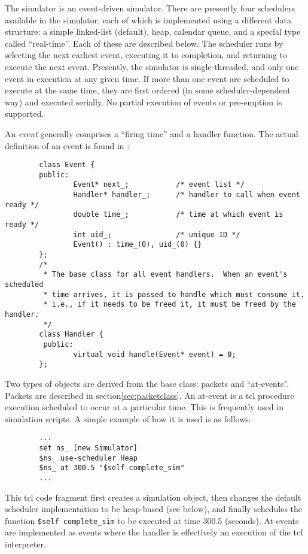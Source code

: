 The simulator is an event-driven simulator.
There are presently four schedulers available in the simulator, each
of which is implemented using a different data structure:
a simple linked-list (default), heap, calendar queue, and a special
type called ``real-time''.  Each of these are described below.
The scheduler runs by selecting the next earliest event, executing
it to completion, and returning to execute the next event.
Presently, the simulator is single-threaded, and only one event
in execution at any given time.
If more than one event are scheduled to execute at the same time,
they are first ordered (in some scheduler-dependent way) and executed
serially.
No partial execution of events or pre-emption is supported.

An {\em event} generally comprises a ``firing time'' and a handler function.
The actual definition of an event is found in :
\begin{small}
\begin{verbatim}
        class Event { 
        public: 
                Event* next_;           /* event list */ 
                Handler* handler_;      /* handler to call when event ready */
                double time_;           /* time at which event is ready */
                int uid_;               /* unique ID */
                Event() : time_(0), uid_(0) {}
        };   
        /*   
         * The base class for all event handlers.  When an event's scheduled
         * time arrives, it is passed to handle which must consume it.
         * i.e., if it needs to be freed it, it must be freed by the handler.
         */  
        class Handler {
         public: 
                virtual void handle(Event* event) = 0;
        };   
\end{verbatim}
\end{small}

Two types of objects are derived from the base  class:
packets and ``at-events''.
Packets are described in section\ref{sec:packetclass}.
An at-event is a tcl procedure execution scheduled to occur at
a particular time. 
This is frequently used in simulation scripts.
A simple example of how it is used is as follows:
\begin{small}
\begin{verbatim}
        ...
        set ns_ [new Simulator]
        $ns_ use-scheduler Heap
        $ns_ at 300.5 "$self complete_sim"
        ...
\end{verbatim}
\end{small}
This tcl code fragment first creates a simulation object,
then changes the default scheduler implementation to be heap-based
(see below), and finally schedules the function {\tt \$self complete\_sim}
to be executed at time 300.5 (seconds).
At-events are implemented as events where the handler is
effectively an execution of the tcl interpreter.

